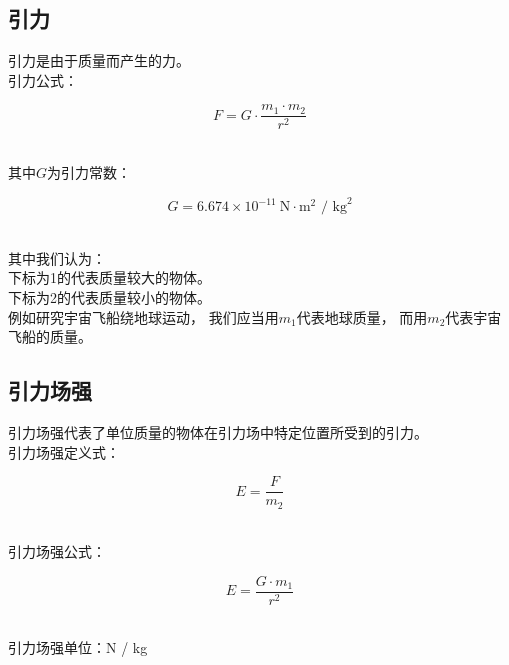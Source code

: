 \documentclass[UTF8]{ctexart}
\begin{document}
\newpage

\subsection{引力}
    引力是由于质量而产生的力。\\[3mm]
    引力公式：
    \begin{large}
        \begin{equation*}
            F = G \cdot \frac{m_{1} \cdot m_{2}}{{r}^{2}} 
        \end{equation*}
    \end{large}\\
    其中$G$为引力常数：
    \begin{large}
        \begin{equation*}
            G = 6.674 \times {10}^{-11}~\text{N}\cdot\text{m}^2\text{ / kg}^2
        \end{equation*}
    \end{large}\\[2mm]
    其中我们认为：\\[3mm]
    下标为1的代表质量较大的物体。\\[2mm]
    下标为2的代表质量较小的物体。\\[3mm]
    例如研究宇宙飞船绕地球运动，
    我们应当用$m_1$代表地球质量，
    而用$m_2$代表宇宙飞船的质量。

\subsection{引力场强}
    引力场强代表了单位质量的物体在引力场中特定位置所受到的引力。\\[3mm]
    引力场强定义式：\vspace{3pt}
    \begin{large}
        \begin{equation*}
            E=\frac{F}{m_2}
        \end{equation*}
    \end{large}\\
    引力场强公式：\vspace{3pt}
    \begin{large}
        \begin{equation*}
            E=\frac{G\cdot m_{1}}{{r}^{2}}       
        \end{equation*}
    \end{large}\\
    引力场强单位：N / kg
\end{document}
